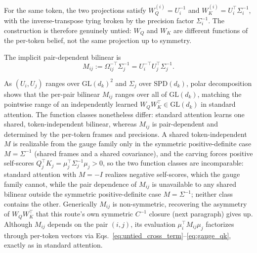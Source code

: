 \documentclass[11pt]{article}
\begin{document}
For the same token, the two projections satisfy $W_Q^{(i)} = U_i^{-1}$ and $W_K^{(i)} = U_i^\top \Sigma_i^{-1}$, with the inverse-transpose tying broken by the precision factor $\Sigma_i^{-1}$. The construction is therefore genuinely untied: $W_Q$ and $W_K$ are different functions of the per-token belief, not the same projection up to symmetry.

The implicit pair-dependent bilinear is
\begin{equation}
M_{ij} := \Omega_{ij}^{-\top}\Sigma_j^{-1} = U_i^{-\top} U_j^\top \Sigma_j^{-1}.
\label{eq:gauge_bilinear}
\end{equation}

As $(U_i, U_j)$ ranges over $\mathrm{GL}(d_k)^2$ and $\Sigma_j$ over $\mathrm{SPD}(d_k)$, polar decomposition shows that the per-pair bilinear $M_{ij}$ ranges over all of $\mathrm{GL}(d_k)$, matching the pointwise range of an independently learned $W_Q W_K^\top \in \mathrm{GL}(d_k)$ in standard attention. The function classes nonetheless differ: standard attention learns one shared, token-independent bilinear, whereas $M_{ij}$ is pair-dependent and determined by the per-token frames and precisions. A shared token-independent $M$ is realizable from the gauge family only in the symmetric positive-definite case $M = \Sigma^{-1}$ (shared frames and a shared covariance), and the carving forces positive self-scores $Q_j^\top K_j = \mu_j^\top\Sigma_j^{-1}\mu_j > 0$, so the two function classes are incomparable: standard attention with $M = -I$ realizes negative self-scores, which the gauge family cannot, while the pair dependence of $M_{ij}$ is unavailable to any shared bilinear outside the symmetric positive-definite case $M = \Sigma^{-1}$; neither class contains the other. Generically $M_{ij}$ is non-symmetric, recovering the asymmetry of $W_QW_K^\top$ that this route's own symmetric $C^{-1}$ closure (next paragraph) gives up. Although $M_{ij}$ depends on the pair $(i,j)$, its evaluation $\mu_i^\top M_{ij}\mu_j$ factorizes through per-token vectors via Eqs.~\eqref{eq:untied_cross_term}--\eqref{eq:gauge_qk}, exactly as in standard attention.
\end{document}
